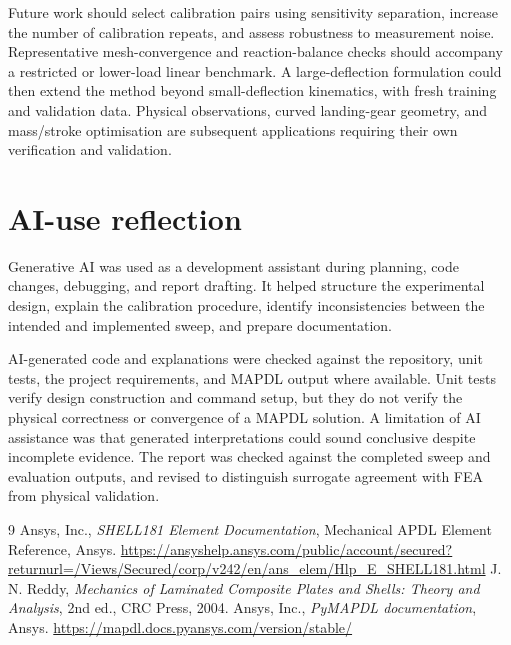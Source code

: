 \documentclass[11pt]{article}
\begin{document}
Future work should select calibration pairs using sensitivity separation, increase the number of calibration repeats, and assess robustness to measurement noise. Representative mesh-convergence and reaction-balance checks should accompany a restricted or lower-load linear benchmark. A large-deflection formulation could then extend the method beyond small-deflection kinematics, with fresh training and validation data. Physical observations, curved landing-gear geometry, and mass/stroke optimisation are subsequent applications requiring their own verification and validation.

\section{AI-use reflection}
Generative AI was used as a development assistant during planning, code changes, debugging, and report drafting. It helped structure the experimental design, explain the calibration procedure, identify inconsistencies between the intended and implemented sweep, and prepare documentation. 

AI-generated code and explanations were checked against the repository, unit tests, the project requirements, and MAPDL output where available. Unit tests verify design construction and command setup, but they do not verify the physical correctness or convergence of a MAPDL solution. A limitation of AI assistance was that generated interpretations could sound conclusive despite incomplete evidence. The report was checked against the completed sweep and evaluation outputs, and revised to distinguish surrogate agreement with FEA from physical validation.

\begin{thebibliography}{9}\footnotesize
{} Ansys, Inc., \emph{SHELL181 Element Documentation}, Mechanical APDL Element Reference, Ansys. \url{https://ansyshelp.ansys.com/public/account/secured?returnurl=/Views/Secured/corp/v242/en/ans_elem/Hlp_E_SHELL181.html}
 J. N. Reddy, \emph{Mechanics of Laminated Composite Plates and Shells: Theory and Analysis}, 2nd ed., CRC Press, 2004.
 Ansys, Inc., \emph{PyMAPDL documentation}, Ansys. \url{https://mapdl.docs.pyansys.com/version/stable/}
\end{thebibliography}
\end{document}
